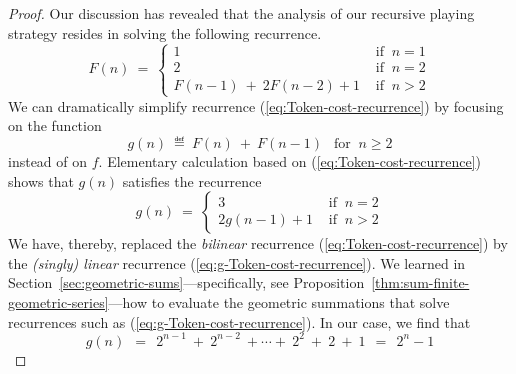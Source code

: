 \begin{proof}
Our discussion has revealed that the analysis of our recursive playing
strategy resides in solving the following recurrence.
\begin{equation}
\label{eq:Token-cost-recurrence}
F(n) \ = \ \left\{
\begin{array}{ll}
1 & \mbox{ if } \ n=1 \\
2 & \mbox{ if } \ n=2 \\
F(n-1) \ + \ 2 F(n-2) + 1 & \mbox{ if } \  n > 2
\end{array}
\right.
\end{equation}
We can dramatically simplify recurrence
(\ref{eq:Token-cost-recurrence}) by focusing on the function
\[ g(n) \ \eqdef \ F(n) \ + \ F(n-1) \ \ \mbox{ for } \ n \geq 2 \]
instead of on $f$.  Elementary calculation based on
(\ref{eq:Token-cost-recurrence}) shows that $g(n)$ satisfies the
recurrence
\begin{equation}
\label{eq:g-Token-cost-recurrence}
g(n) \ = \ \left\{
\begin{array}{ll}
3 & \mbox{ if } \ n=2 \\
2 g(n-1) + 1 & \mbox{ if } \  n > 2
\end{array}
\right.
\end{equation}
We have, thereby, replaced the {\em bilinear} recurrence
(\ref{eq:Token-cost-recurrence}) by the {\em (singly) linear}
recurrence (\ref{eq:g-Token-cost-recurrence}).  We learned in
Section~\ref{sec:geometric-sums}---specifically, see
Proposition~\ref{thm:sum-finite-geometric-series}---how to evaluate
the geometric summations that solve recurrences such as
(\ref{eq:g-Token-cost-recurrence}).  In our case, we find that
%
\begin{equation}
\label{eq:VALUE-g-Token-cost}
g(n) \ \ = \ \ 2^{n-1} \ + \ 2^{n-2} \ + \cdots + \ 2^2 \ + \ 2 \ +
\ 1 \ \ = \ \ 2^{n} -1
\end{equation}
%

\medskip


\end{proof}
